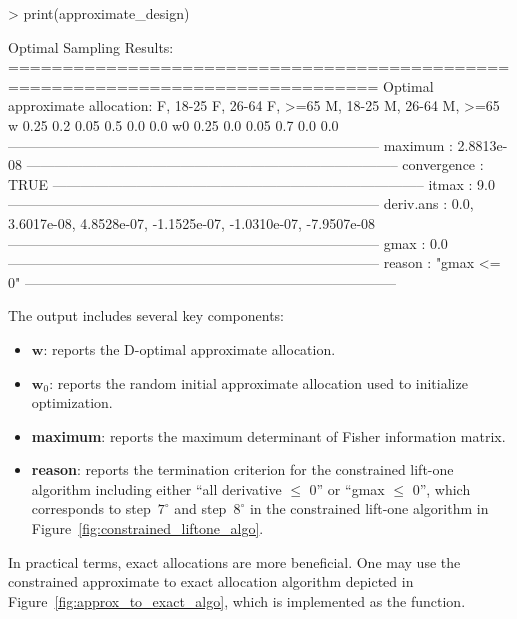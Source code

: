 \begin{example}
  > print(approximate_design)

  Optimal Sampling Results:
  ================================================================================
  Optimal approximate allocation:
  F, 18-25 F, 26-64 F, >=65 M, 18-25 M, 26-64 M, >=65
  w  0.25     0.2      0.05    0.5      0.0      0.0
  w0 0.25     0.0      0.05    0.7      0.0      0.0
  --------------------------------------------------------------------------------
  maximum :
  2.8813e-08
  --------------------------------------------------------------------------------
  convergence :
  TRUE
  --------------------------------------------------------------------------------
  itmax :
  9.0
  --------------------------------------------------------------------------------
  deriv.ans :
  0.0, 3.6017e-08, 4.8528e-07, -1.1525e-07, -1.0310e-07, -7.9507e-08
  --------------------------------------------------------------------------------
  gmax :
  0.0
  --------------------------------------------------------------------------------
  reason :
  "gmax <= 0"
  --------------------------------------------------------------------------------
\end{example}

\noindent The output includes several key components:
\begin{itemize}
  \item $\mathbf w$: reports the D-optimal approximate allocation.
  \item $\mathbf w_0$: reports the random initial approximate allocation used to initialize optimization.
  \item \textbf{maximum}: reports the maximum determinant of Fisher information matrix.
  \item \textbf{reason}: reports the termination criterion for the constrained lift-one algorithm including either ``all derivative $\le$ 0'' or ``gmax $\le$ 0'', which corresponds to step~$7^\circ$ and step~$8^\circ$ in the constrained lift-one algorithm in Figure~\ref{fig:constrained_liftone_algo}.
\end{itemize}

In practical terms, exact allocations are more beneficial. One may use the constrained approximate to exact allocation algorithm depicted in Figure~\ref{fig:approx_to_exact_algo}, which is implemented as the \texttt{} function.

